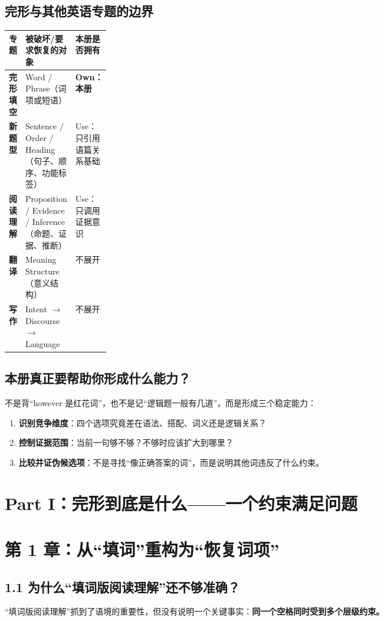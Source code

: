 \documentclass[11pt,a4paper]{ctexart}
\newcommand{\kw}[1]{\textbf{#1}}
\begin{document}
\subsection{完形与其他英语专题的边界}
\begin{center}
\small
\begin{tabularx}{\linewidth}{>{\bfseries}p{0.20\linewidth} X X}
\toprule
专题 & 被破坏/要求恢复的对象 & 本册是否拥有 \\
\midrule
完形填空 & Word / Phrase（词项或短语） & \textbf{Own：本册} \\
新题型 & Sentence / Order / Heading（句子、顺序、功能标签） & Use：只引用语篇关系基础 \\
阅读理解 & Proposition / Evidence / Inference（命题、证据、推断） & Use：只调用证据意识 \\
翻译 & Meaning Structure（意义结构） & 不展开 \\
写作 & Intent $\rightarrow$ Discourse $\rightarrow$ Language & 不展开 \\
\bottomrule
\end{tabularx}
\end{center}

\subsection{本册真正要帮助你形成什么能力？}
不是背“however 是红花词”，也不是记“逻辑题一般有几道”，而是形成三个稳定能力：
\begin{enumerate}
  \item \kw{识别竞争维度}：四个选项究竟差在语法、搭配、词义还是逻辑关系？
  \item \kw{控制证据范围}：当前一句够不够？不够时应该扩大到哪里？
  \item \kw{比较并证伪候选项}：不是寻找“像正确答案的词”，而是说明其他词违反了什么约束。
\end{enumerate}

\newpage
\section{Part I：完形到底是什么——一个约束满足问题}

\section{第 1 章：从“填词”重构为“恢复词项”}

\subsection{1.1 为什么“填词版阅读理解”还不够准确？}
“填词版阅读理解”抓到了语境的重要性，但没有说明一个关键事实：\kw{同一个空格同时受到多个层级约束。}
\end{document}
